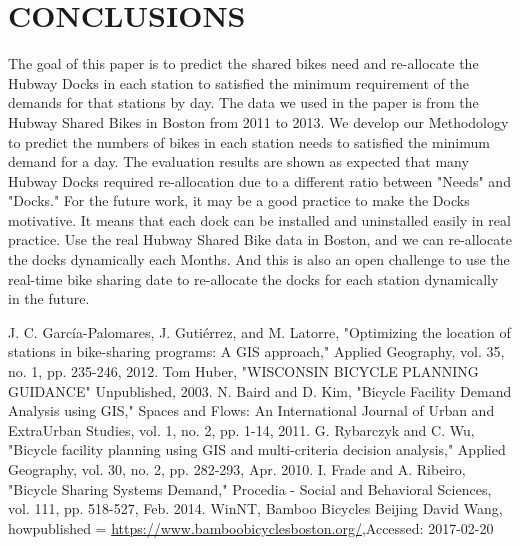 \documentclass[journal, letterpaper]{IEEEtran}
\begin{document}
\section{CONCLUSIONS}
\large
The goal of this paper is to predict the shared bikes need and re-allocate the Hubway Docks in each station to satisfied the minimum requirement of the demands for that stations by day. The data we used in the paper is from the Hubway Shared Bikes in Boston from 2011 to 2013.  We develop our Methodology to predict the numbers of bikes in each station needs to satisfied the minimum demand for a day. The evaluation results are shown as expected that many Hubway Docks required re-allocation due to a different ratio between "Needs" and "Docks." For the future work, it may be a good practice to make the Docks motivative. It means that each dock can be installed and uninstalled easily in real practice. Use the real Hubway Shared Bike data in Boston, and we can re-allocate the docks dynamically each Months. And this is also an open challenge to use the real-time bike sharing date to re-allocate the docks for each station dynamically in the future. 


\begin{thebibliography}{99}

 J. C. García-Palomares, J. Gutiérrez, and M. Latorre, "Optimizing the location of stations in bike-sharing programs: A GIS approach," Applied Geography, vol. 35, no. 1, pp. 235-246, 2012.
 Tom Huber, "WISCONSIN BICYCLE PLANNING GUIDANCE" Unpublished, 2003.
 N. Baird and D. Kim, "Bicycle Facility Demand Analysis using GIS," Spaces and Flows: An International Journal of Urban and ExtraUrban Studies, vol. 1, no. 2, pp. 1-14, 2011.
 G. Rybarczyk and C. Wu, "Bicycle facility planning using GIS and multi-criteria decision analysis," Applied Geography, vol. 30, no. 2, pp. 282-293, Apr. 2010.
 I. Frade and A. Ribeiro, "Bicycle Sharing Systems Demand," Procedia - Social and Behavioral Sciences, vol. 111, pp. 518-527, Feb. 2014.
 {WinNT, {{ Bamboo Bicycles Beijing} David Wang}, howpublished = {\url{https://www.bamboobicyclesboston.org/}},{Accessed: 2017-02-20}}

\end{thebibliography}
\end{document}
